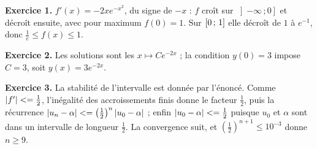 \begin{corrige}
\textbf{Exercice 1.} $f'(x) = -2xe^{-x^{2}}$, du signe de $-x$ : $f$ croît sur
$\left]-\infty\,;0\right]$ et décroît ensuite, avec pour maximum $f(0) = 1$.
Sur $\left[0\,;\,1\right]$ elle décroît de $1$ à $e^{-1}$, donc
$\frac1e \leq f(x) \leq 1$.

\textbf{Exercice 2.} Les solutions sont les $x\mapsto Ce^{-2x}$ ; la condition
$y(0) = 3$ impose $C = 3$, soit $y(x) = 3e^{-2x}$.

\textbf{Exercice 3.} La stabilité de l'intervalle est donnée par l'énoncé. Comme
$\left|f'\right| <= \frac12$, l'inégalité des accroissements finis donne le
facteur $\frac12$, puis la récurrence
$\left|u_{n}-\alpha\right| <= \left(\frac12\right)^{n}\left|u_{0}-\alpha\right|$ ; enfin
$\left|u_{0}-\alpha\right| <= \frac12$ puisque $u_{0}$ et $\alpha$ sont dans un
intervalle de longueur $\frac12$. La convergence suit, et
$\left(\frac12\right)^{n+1} \leq 10^{-3}$ donne $n \geq 9$.

\end{corrige}
